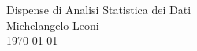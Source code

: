 \documentclass[a4paper,11pt]{article}
\theoremstyle{definition}
\begin{document}
\begin{titlepage}
\centering
{\Large Dispense di Analisi Statistica dei Dati}\\[0.4cm]
{\large Michelangelo Leoni}\\[0.2cm]
{\large \today}
\end{titlepage}

\tableofcontents
\newpage

\end{document}
